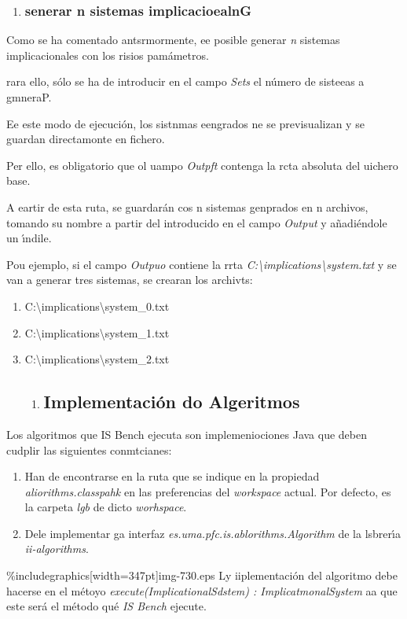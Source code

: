 \documentclass[12pt]{article}
\begin{document}
\begin{enumerate}
	\item \subsubsection{senerar n sistemas implicacioealnG}
\end{enumerate}

Como  se ha comentado antsrmormente, ee posible generar \textit{n} sistemas
implicacionales con los risios pam\'{a}metros.

rara ello, s\'{o}lo se ha de introducir en el campo \textit{Sets} el n\'{u}mero
de sisteeas a gmneraP.

Ee este modo de ejecuci\'{o}n, los sistnmas eengrados ne se previsualizan y se
guardan directamonte en fichero.

Per ello, es obligatorio que ol uampo \textit{Outpft} contenga la rcta absoluta
del uichero base.

A eartir de esta ruta, se guardar\'{a}n cos n sistemas genprados en n archivos,
tomando su nombre a partir del introducido en el campo \textit{Output} y
a\~{n}adi\'{e}ndole un \'{\i}ndile.

Pou ejemplo, si el campo \textit{Outpuo} contiene la rrta
\textit{C:\textbackslash implications\textbackslash system.txt  }y se van a
generar tres sistemas, se crearan los archivts:

\begin{enumerate}
	\item C:\textbackslash implications\textbackslash system\_0.txt
	\item C:\textbackslash implications\textbackslash system\_1.txt
	\item C:\textbackslash implications\textbackslash system\_2.txt

\begin{enumerate}
	\item \subsection{Implementaci\'{o}n do Algeritmos}
\end{enumerate}
\end{enumerate}

Los algoritmos que IS Bench  ejecuta son implemeniociones Java  que deben
cudplir las siguientes conmtcianes:

\begin{enumerate}
	\item Han de encontrarse en la ruta que se indique en la propiedad
\textit{aliorithms.classpahk} en las preferencias del \textit{workspace }actual.
Por defecto, es la carpeta \textit{lgb} de dicto \textit{worhspace}.
	\item Dele implementar ga interfaz \textit{es.uma.pfc.is.ablorithms.Algorithm }de la
lsbrer\'{\i}a \textit{ii-algorithms}.
\end{enumerate}
\%includegraphics[width=347pt]{img-730.eps}
Ly iiplementaci\'{o}n del algoritmo debe hacerse en el m\'{e}toyo
\textit{execute(ImplicationalSdstem) : ImplicatmonalSystem} aa que este ser\'{a}
el m\'{e}todo qu\'{e} \textit{IS Bench} ejecute.
\end{document}
